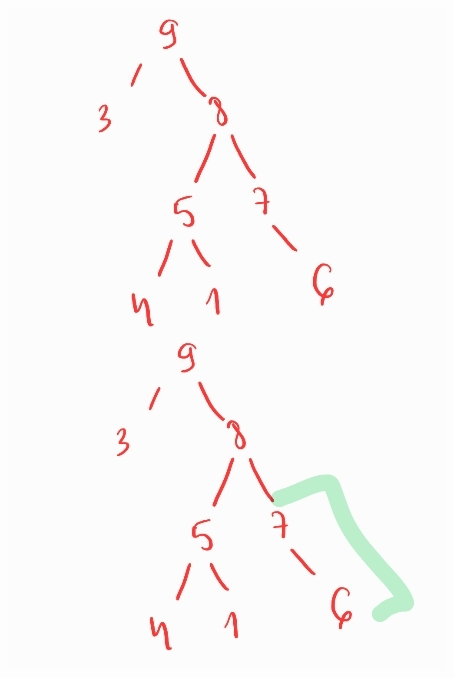 \documentclass[12pt]{article}
\begin{document}
\includegraphics[scale=0.5]{zad5_2.png}
\end{document}
